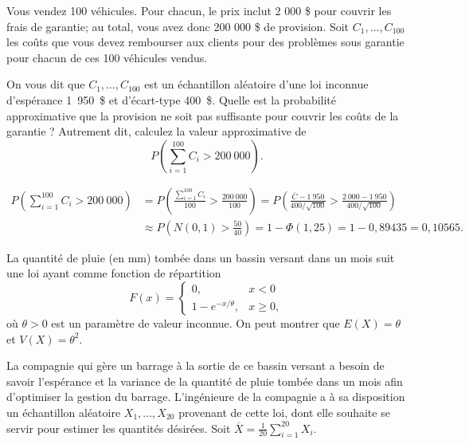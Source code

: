 \begin{questions}
\begin{parts}
    \end{parts}



\pageblanche


\question[10] Vous vendez 100 véhicules. Pour chacun, le prix inclut 2 000 \$ pour couvrir les frais de garantie; au total, vous avez donc 200 000 \$ de provision.
Soit $C_1,\dots,C_{100}$ les coûts que vous devez rembourser aux clients pour des problèmes sous garantie pour chacun de ces 100 véhicules vendus. 

On vous dit que
$C_1,\dots,C_{100}$ est un échantillon aléatoire d'une loi inconnue d'espérance 1~950~\$ et d'écart-type 400~\$. Quelle est la probabilité approximative
que la provision ne soit pas suffisante pour couvrir les coûts de la garantie ? Autrement dit, calculez la valeur approximative de
$$P\left(\sum_{i=1}^{100}C_i > 200~000\right).$$

\begin{solution}
\begin{align*}
    P\left(\sum_{i=1}^{100}C_i > 200~000\right) &= P\left(\frac{\sum_{i=1}^{100}C_i}{100} > \frac{200~000}{100}\right)
=P\left(\frac{\bar{C}-1~950}{400/\sqrt{100}} > \frac{2~000-1~950}{400/\sqrt{100}}\right)\\
 &\approx P\left(N(0,1) > \frac{50}{40}\right)=1-\Phi(1,25)=1-0,89435=0,10565.
\end{align*}  
\end{solution}



\pageblanche


\question\label{EQM} La quantité de pluie (en mm) tombée dans un bassin versant
dans un mois suit une loi ayant comme fonction de répartition
$$F(x)=\left\{\begin{array}{ll}
0, & x<0\\
1-e^{-x/\theta}, & x\ge 0,
\end{array}\right.$$
où $\theta>0$ est un paramètre de valeur inconnue. On peut montrer que $E(X)=\theta$ et $V(X)=\theta^2$.

La compagnie qui gère un barrage à la sortie de ce bassin versant a besoin de savoir l'espérance et la variance de la quantité de pluie tombée
dans un mois afin d'optimiser la gestion du barrage. L'ingénieure de la compagnie a à sa disposition un échantillon aléatoire $X_1,\dots,X_{20}$
provenant de cette loi, dont elle souhaite se servir pour estimer les quantités désirées. Soit $\displaystyle \overline{X}=\frac{1}{20}\sum_{i=1}^{20}X_i$.


\end{questions}

